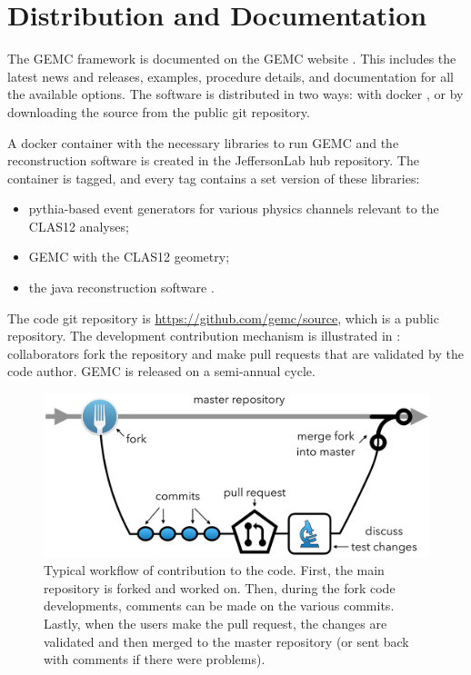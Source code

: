 \section{Distribution and Documentation}

The GEMC framework is documented on the GEMC website \cite{GEMC}. This includes the latest news and releases,
examples, procedure details, and documentation for all the available options.
The software is distributed in two ways: with docker \cite{jlabDocker}, or by downloading the source from the public git repository.

A docker container with the necessary libraries to run GEMC and the reconstruction software
is created in the JeffersonLab hub repository.
The container is tagged, and every tag contains a set version of these libraries:

\begin{itemize}
	\item pythia-based event generators for various physics channels relevant to the CLAS12 analyses;
	\item GEMC with the CLAS12 geometry;
	\item the java reconstruction software \cite{recon-nim}.
\end{itemize}


The code git repository is \url{https://github.com/gemc/source}, which is a public repository.
The development contribution mechanism is illustrated in : collaborators fork the repository
and make pull requests that are validated by the code author.
GEMC is released on a semi-annual cycle.

\begin{figure}
	\centering
	\includegraphics[width=0.99\columnwidth,keepaspectratio]{img/github.png}
	\caption{Typical workflow of contribution to the code. First, the main repository is forked and worked on. Then, during the fork code developments,
	         comments can be made on the various commits. Lastly, when the users make the pull request, the changes are validated and then merged
             to the master repository (or sent back with comments if there were problems).}
	\label{fig:github}
\end{figure}


